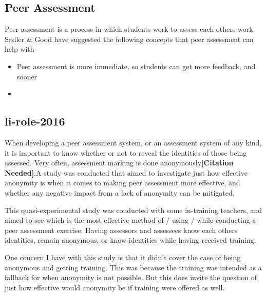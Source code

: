 \documentclass[a4paper,11pt]{report}
\newcommand{\cn}{\textbf{[Citation Needed]}}
\begin{document}
\subsection{Peer Assessment}
Peer assessment is a process in which students work to assess each others work. Sadler \& Good \cite{sadler_impact_2006} have suggested the following concepts that peer assessment can help with
\begin{itemize}
 \item Peer assessment is more immediate, so students can get more feedback, and sooner
 \item 
\end{itemize}


\subsection{li-role-2016}
When developing a peer assessment system, or an assessment system of any kind, it is important to know whether or not to reveal the identities of those being assessed. Very often, assessment marking is done anonymously\cn.A study was conducted\cite{li_role_2016} that aimed to investigate just how effective anonymity is when it comes to making peer assessment more effective, and whether any negative impact from a lack of anonymity can be mitigated.\par
This quasi-experimental study was conducted with some in-training teachers, and aimed to see which is the most effective method of / using / while conducting a peer assessment exercise: Having assessors and assessees know each others identities, remain anonymous, or know identities while having received training.\par
One concern I have with this study is that it didn't cover the case of being anonymous and getting training. This was because the training was intended as a fallback for when anonymity is not possible. But this does invite the question of just how effective would anonymity be if training were offered as well.\par
\end{document}

